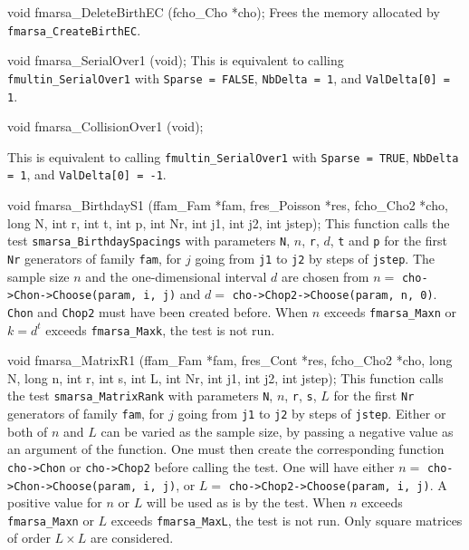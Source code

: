 void fmarsa_DeleteBirthEC (fcho_Cho *cho);
\endcode
 \tab 
  Frees the memory allocated by {\tt fmarsa\_CreateBirthEC}.
 \endtab




\code

void fmarsa_SerialOver1 (void);
\endcode
\tab  This is equivalent to calling {\tt fmultin\_SerialOver1} with 
  {\tt Sparse = FALSE}, {\tt NbDelta = 1}, and {\tt Val\-Delta[0] = 1}.
\endtab
\code


void fmarsa_CollisionOver1 (void);
\endcode

\tab This is equivalent to calling {\tt fmultin\_SerialOver1} with 
  {\tt Sparse = TRUE}, {\tt NbDelta = 1}, and {\tt Val\-Delta[0] = -1}.
\endtab
\code


void fmarsa_BirthdayS1 (ffam_Fam *fam, fres_Poisson *res, fcho_Cho2 *cho,
                        long N, int r, int t, int p,
                        int Nr, int j1, int j2, int jstep);
\endcode
\tab  This function calls the test {\tt smarsa\_BirthdaySpacings} with
  parameters {\tt N}, $n$,  {\tt r}, $d$, {\tt t} and  {\tt p} for the
  first {\tt Nr} generators of family {\tt fam}, for $j$ going from
  {\tt j1} to {\tt j2} by steps of {\tt jstep}. The sample  size $n$ and
  the one-dimensional interval $d$ are chosen from 
  $n = {}$ {\tt cho->Chon->Choose(param, i, j)} and 
  $d = {}$ {\tt cho->Chop2->Choose(param, n, 0)}. {\tt Chon} and
  {\tt Chop2} must have been created before. When $n$ exceeds
  {\tt fmarsa\_Maxn} or $k = d^t$ exceeds {\tt fmarsa\_Maxk},
  the test is not run.
\endtab
\code


void fmarsa_MatrixR1 (ffam_Fam *fam, fres_Cont *res, fcho_Cho2 *cho,
                      long N, long n, int r, int s, int L,
                      int Nr, int j1, int j2, int jstep);
\endcode
  \tab  This function calls the test {\tt smarsa\_MatrixRank} with
  parameters {\tt N}, $n$,  {\tt r},  {\tt s}, $L$ for the first {\tt Nr}
  generators of family {\tt fam}, for $j$ going from {\tt j1} to {\tt j2}
  by steps of {\tt jstep}. Either or both of $n$ and $L$ can be varied as
  the sample size, by passing a negative value as an argument of the
  function. One must then create the corresponding function
  {\tt cho->Chon} or {\tt cho->Chop2} before calling the test.
  One will have either $n = {}$ {\tt cho->Chon->Choose(param, i, j)},
  or $L = {}$ {\tt cho->Chop2->Choose(param, i, j)}. A positive value for
  $n$ or $L$ will be used as is by the test. When $n$ exceeds
 {\tt fmarsa\_Maxn} or  $L$ exceeds {\tt fmarsa\_MaxL}, the test is not
 run. Only square matrices of order $L\times L$ are considered.
 \endtab
\code


